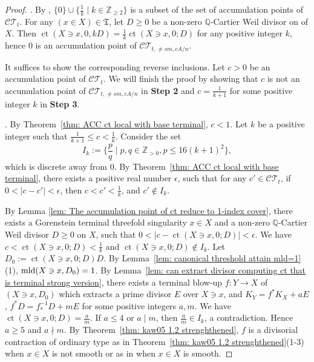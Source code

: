 \documentclass[11pt]{amsart}
\numberwithin{equation}{section}
\newcommand{\Qq}{\mathbb{Q}}
\newcommand{\Zz}{\mathbb{Z}}
\newcommand{\mld}{{\rm{mld}}}
\newcommand{\ct}{\operatorname{ct}}
\theoremstyle{definition}
\theoremstyle{definition}
\begin{document}
\begin{proof}
. By \cite[Theorem~3.6]{Ste11}, $\{0\}\cup\{\frac{1}{k}\mid k\in \Zz_{\geq 2}\}$ is a subset of the set of accumulation points of $\mathcal{CT}_t$. For any $(x\in X)\in\mathfrak{T}$, let $D\geq 0$ be a non-zero $\Qq$-Cartier Weil divisor on of $X$. Then $\ct(X\ni x,0,kD)=\frac{1}{k}\ct(X\ni x, 0;D)$ for any positive integer $k$, hence $0$ is an accumulation point of $\mathcal{CT}_{t,\neq{ sm,cA/n}}$. 

It suffices to show the corresponding reverse inclusions. Let $c>0$ be an accumulation point of $\mathcal{CT}_t$. We will finish the proof by showing that $c$ is not an accumulation point of $\mathcal{CT}_{t,\neq{ sm,cA/n}}$ in {\bf Step 2} and $c=\frac{1}{k+1}$ for some positive integer $k$ in {\bf Step 3}.

\medskip

.  By Theorem~\ref{thm: ACC ct local with base terminal}, $c<1$. Let $k$ be a positive integer such that $\frac{1}{k+1}\leq c<\frac{1}{k}$. Consider the set $$I_k:=\{\frac{p}{q}\mid p,q\in \Zz_{>0},p\leq 16(k+1)^2\},$$ which is discrete away from 0. By Theorem~\ref{thm: ACC ct local with base terminal}, there exists a positive real number $\epsilon$, such that for any $c'\in \mathcal{CT}_t$, if $0<|c-c'|< \epsilon$, then $c<c'<\frac{1}{k}$, and $c'\notin I_k$.

By Lemma \ref{lem: The accumulation point of ct reduce to 1-index cover}, there exists a Gorenstein terminal threefold singularity $x\in X$ and a non-zero $\Qq$-Cartier Weil divisor $D\geq 0$ on $X$, such that $0<|c-\ct(X\ni x,0; D)|<\epsilon$.  We have $c<\ct(X\ni x, 0; D)<\frac{1}{k}$ and $\ct(X\ni x, 0; D)\notin I_k$. Let $D_0:=\ct(X\ni x, 0; D)D$. By Lemma~\ref{lem: canonical threshold attain mld=1}(1), $\mld(X\ni x, D_0)=1$. By Lemma~\ref{lem: can extract divisor computing ct that is terminal strong version}, there exists a terminal blow-up $f: Y\to X$ of $(X\ni x,D_0)$ which extracts a prime divisor $E$ over $X\ni x$, and $K_Y=f^*K_X+aE$, $f^*D=f_*^{-1}D+mE$ for some positive integers $a,m$. We have $\ct(X\ni x, 0;D)=\frac{a}{m}$. If $a\leq 4$ or $a\mid m$, then $\frac{a}{m}\in I_k$, a contradiction. Hence $a\geq 5$ and $a\nmid m$. By Theorem~\ref{thm: kaw05 1.2 strenghthened}, $f$ is a divisorial contraction of ordinary type as in Theorem~\ref{thm: kaw05 1.2 strenghthened}(1-3) when $x\in X$ is not smooth or as in \cite[Theorem~1.1]{Kaw01} when $x\in X$ is smooth.

\medskip


\end{proof}
\end{document}
